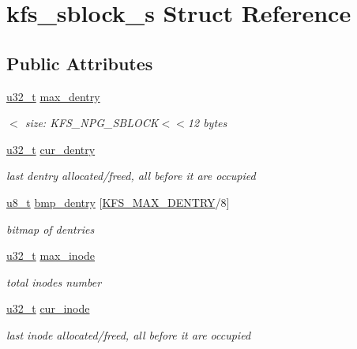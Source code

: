 \hypertarget{structkfs__sblock__s}{\section{kfs\-\_\-sblock\-\_\-s Struct Reference}
\label{structkfs__sblock__s}
}
\subsection*{Public Attributes}
\begin{DoxyCompactItemize}
\item 
\hyperlink{kfs_8c_a0c0a490ab7fa397be6c764a935cc5ea4}{u32\-\_\-t} \hyperlink{structkfs__sblock__s_a8821a5865dacd4eea0bcae64e23b3aa5}{max\-\_\-dentry}
\begin{DoxyCompactList}\small\item\em $<$ size\-: K\-F\-S\-\_\-\-N\-P\-G\-\_\-\-S\-B\-L\-O\-C\-K$<$$<$12 bytes \end{DoxyCompactList}\item 
\hyperlink{kfs_8c_a0c0a490ab7fa397be6c764a935cc5ea4}{u32\-\_\-t} \hyperlink{structkfs__sblock__s_ab9a8e05095ae32b5274f22f0c937b0bd}{cur\-\_\-dentry}
\begin{DoxyCompactList}\small\item\em last dentry allocated/freed, all before it are occupied \end{DoxyCompactList}\item 
\hyperlink{kfs_8c_ae081489b4906f65a3cb18e9fbe9f8d23}{u8\-\_\-t} \hyperlink{structkfs__sblock__s_a7aa2f7b977d0648b2cbe5b1cdb3234fd}{bmp\-\_\-dentry} \mbox{[}\hyperlink{kfs_8c_a92ab7d744c9853bdebee5c81ac2b422f}{K\-F\-S\-\_\-\-M\-A\-X\-\_\-\-D\-E\-N\-T\-R\-Y}/8\mbox{]}
\begin{DoxyCompactList}\small\item\em bitmap of dentries \end{DoxyCompactList}\item 
\hyperlink{kfs_8c_a0c0a490ab7fa397be6c764a935cc5ea4}{u32\-\_\-t} \hyperlink{structkfs__sblock__s_a50bd71d628473a6b77c6b2512f6742da}{max\-\_\-inode}
\begin{DoxyCompactList}\small\item\em total inodes number \end{DoxyCompactList}\item 
\hyperlink{kfs_8c_a0c0a490ab7fa397be6c764a935cc5ea4}{u32\-\_\-t} \hyperlink{structkfs__sblock__s_a299344e23b26aaf0f60f1f94a0faf966}{cur\-\_\-inode}
\begin{DoxyCompactList}\small\item\em last inode allocated/freed, all before it are occupied \end{DoxyCompactList}\item 

\end{DoxyCompactItemize}
